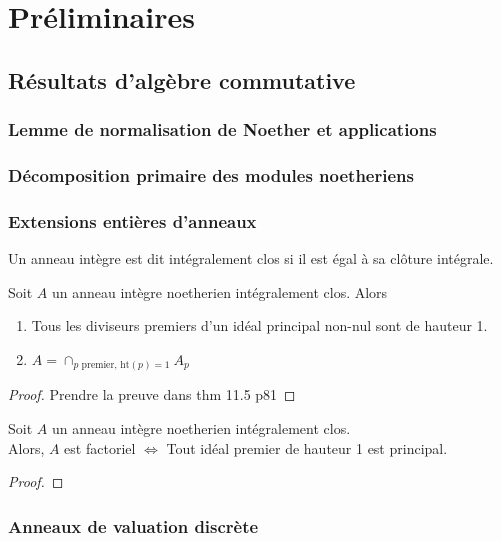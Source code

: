 \chapter{Préliminaires}

\section{Résultats d'algèbre commutative}

\subsection{Lemme de normalisation de Noether et applications}
\subsection{Décomposition primaire des modules noetheriens}

\subsection{Extensions entières d'anneaux}

\begin{defn}
Un anneau intègre est dit intégralement clos si il est égal à sa clôture intégrale.
\end{defn}

\begin{thm}\label{factonormal}
Soit $A$ un anneau intègre noetherien intégralement clos. Alors
\begin{enumerate}
\item Tous les diviseurs premiers d'un idéal principal non-nul sont de hauteur 1.
\item $A=\cap_{p \textrm{ premier, } \textrm{ht}(p)=1} A_p$
\end{enumerate}
\end{thm}
\begin{proof}
Prendre la preuve dans \cite{Matsumura} thm 11.5 p81
\end{proof}


\begin{thm}
Soit $A$ un anneau intègre noetherien intégralement clos. \\
Alors, $A$ est factoriel $\iff$ Tout idéal premier de hauteur 1 est principal.
\end{thm}
\begin{proof}
\end{proof}

\subsection{Anneaux de valuation discrète}


